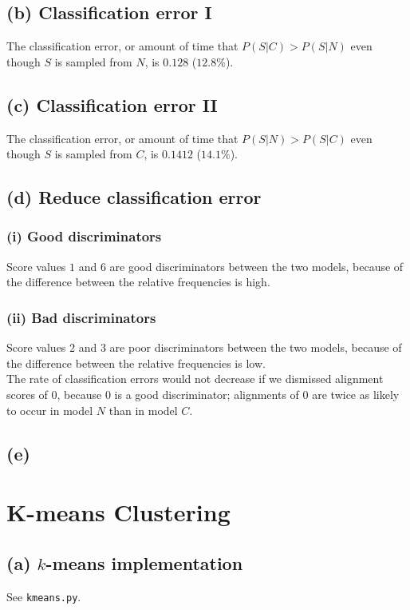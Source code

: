 \documentclass[11pt]{article}
\begin{document}
\subsection*{(b) Classification error I}
The classification error, or amount of time that $P(S | C) > P(S | N)$
even though $S$ is sampled from $N$, is $0.128$ ($12.8\%$).

\subsection*{(c) Classification error II}
The classification error, or amount of time that $P(S | N) > P(S | C)$
even though $S$ is sampled from $C$, is $0.1412$ ($14.1\%$).

\subsection*{(d) Reduce classification error}
\subsubsection*{(i) Good discriminators}
Score values $1$ and $6$ are good discriminators between the two models,
because of the difference between the relative frequencies is high.

\subsubsection*{(ii) Bad discriminators}
Score values $2$ and $3$ are poor discriminators between the two models,
because of the difference between the relative frequencies is low.\\

The rate of classification errors would not decrease if
we dismissed alignment scores of $0$, because
$0$ is a good discriminator; alignments of $0$
are twice as likely to occur in model $N$ than in
model $C$.

\subsection*{(e)}

\section{K-means Clustering}
\subsection*{(a) $k$-means implementation}
See {\tt kmeans.py}.
\end{document}
